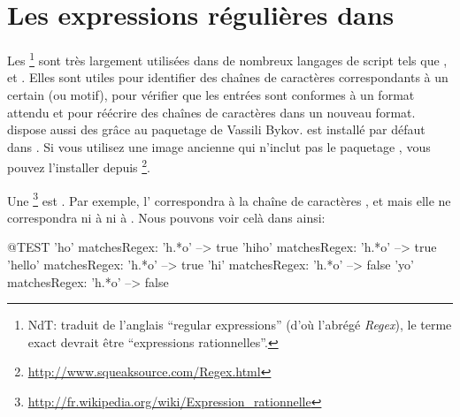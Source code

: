 \documentclass[a4paper,10pt,twoside]{book}
\renewcommand{\nnbb}[2]{}
\begin{document}
\fi
\sloppy
\chapter{Les expressions régulières dans \pharo}


Les \expregs\footnote{NdT: traduit de l'anglais ``regular expressions''
  (d'où l'abrégé \emph{Regex}), le terme exact devrait être
  ``expressions rationnelles''.} sont très largement utilisées dans de
nombreux langages de script tels que ,  et
.
Elles sont utiles pour identifier des chaînes de caractères
correspondants à un certain \pattern (ou motif), pour vérifier que les
entrées sont conformes à un format attendu et pour réécrire des
chaînes de caractères dans un nouveau format.
\pharo dispose aussi des \expregs grâce au paquetage  de
Vassili Bykov.
\pkgregex est installé par défaut dans \pharo. Si vous utilisez une image
ancienne qui n'inclut pas le paquetage \pkgregex, vous pouvez
l'installer depuis \ind{\sqsrc}\footnote{\url{http://www.squeaksource.com/Regex.html}}.

Une \expreg\footnote{\url{http://fr.wikipedia.org/wiki/Expression_rationnelle}}
est .
Par exemple, l'\expreg  {} correspondra à la chaîne de
caractères ,  et  mais elle ne
correspondra ni à  ni à .
Nous pouvons voir celà dans \pharo ainsi:
\begin{code}{@TEST}
'ho' matchesRegex: 'h.*o'     --> true
'hiho' matchesRegex: 'h.*o'  --> true
'hello' matchesRegex: 'h.*o' --> true
'hi' matchesRegex: 'h.*o'      --> false
'yo' matchesRegex: 'h.*o'     --> false
\end{code}
\end{document}

